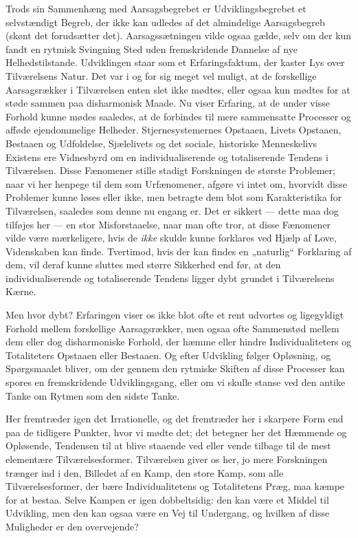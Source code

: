 \documentclass[12pt,a4paper,openany]{book}
\newcommand{\opage}[1]{\marginnote{\footnotesize\textit{[#1]}}}
\begin{document}
Trods sin Sammenhæng med Aarsagsbegrebet er Udviklingsbegrebet et selvstændigt
Begreb, der ikke kan udledes af det almindelige Aarsagsbegreb (skønt det
forudsætter det). Aarsagssætningen vilde ogsaa gælde, selv om der kun fandt en
rytmisk Svingning Sted uden fremskridende Dannelse af nye Helhedstilstande.
Udviklingen staar som et Erfaringsfaktum, der kaster Lys over Tilværelsens
Natur. Det var i og for sig meget vel muligt, at de forskellige Aarsagsrækker i
Tilværelsen enten slet
\opage{67}ikke mødtes, eller ogsaa kun mødtes for at støde sammen paa
disharmonisk Maade. Nu viser Erfaring, at de under visse Forhold kunne mødes
saaledes, at de forbindes til mere sammensatte Processer og afføde
ejendommelige Helheder. Stjernesystemernes Opstaaen, Livets Opstaaen, Bestaaen
og Udfoldelse, Sjælelivets og det sociale, historiske Menneskelivs Existens ere
Vidnesbyrd om en individualiserende og totaliserende Tendens i Tilværelsen.
Disse Fænomener stille stadigt Forskningen de største Problemer; naar vi her
henpege til dem som Urfænomener, afgøre vi intet om, hvorvidt disse Problemer
kunne løses eller ikke, men betragte dem blot som Karakteristika for
Tilværelsen, saaledes som denne nu engang er. Det er sikkert --- dette maa dog
tilføjes her --- en stor Misforstaaelse, naar man ofte tror, at disse Fænomener
vilde være mærkeligere, hvis de \textit{ikke} skulde kunne forklares ved Hjælp
af Love, Videnskaben kan finde. Tvertimod, hvis der kan findes en „naturlig“
Forklaring af dem, vil deraf kunne sluttes med større Sikkerhed end før, at den
individualiserende og totaliserende Tendens ligger dybt grundet i Tilværelsens Kærne.

Men hvor dybt? Erfaringen viser os ikke blot ofte et rent udvortes og
ligegyldigt Forhold mellem forskellige Aarsagsrækker, men ogsaa ofte Sammenstød
mellem dem eller dog disharmoniske Forhold, der hæmme eller hindre
Individualiteters og Totaliteters Opstaaen eller Bestaaen. Og efter Udvikling
følger Opløsning, og Spørgsmaalet bliver, om der gennem den rytmiske Skiften af
disse Processer kan spores en fremskridende Udviklingsgang, eller om vi skulle
stanse ved den antike Tanke om Rytmen som den sidste Tanke.

Her fremtræder igen det Irrationelle, og det fremtræder her i skarpere Form end
paa de tidligere Punkter, hvor vi mødte det; det betegner her det Hæmmende og
Opløsende, Tendensen til at blive staaende ved eller vende tilbage til de mest
elementære Tilværelsesformer. Tilværelsen giver os her, jo mere Forskningen
trænger ind i den, Billedet af en Kamp, den store Kamp, som alle
Tilværelsesformer, der bære Individualitetens og Totalitetens Præg, maa kæmpe
for at bestaa. Selve Kampen er igen
\opage{68}dobbeltsidig: den kan være et Middel til Udvikling, men den kan ogsaa
være en Vej til Undergang, og hvilken af disse Muligheder er den overvejende?
\end{document}
